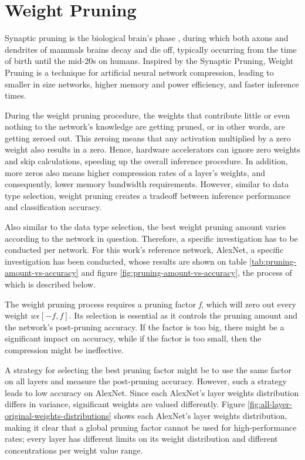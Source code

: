 \section{Weight Pruning}
Synaptic pruning is the biological brain's phase \cite{Synaptic-Pruning-Wikipedia}, during which both axons and dendrites of mammals brains decay and die off, typically occurring from the time of birth until the mid-20s on humans. Inspired by the Synaptic Pruning, Weight Pruning is a technique for artificial neural network compression, leading to smaller in size networks, higher memory and power efficiency, and faster inference times.

During the weight pruning procedure, the weights that contribute little or even nothing to the network's knowledge are getting pruned, or in other words, are getting zeroed out. This zeroing means that any activation multiplied by a zero weight also results in a zero. Hence, hardware accelerators can ignore zero weights and skip calculations, speeding up the overall inference procedure. In addition, more zeros also means higher compression rates of a layer's weights, and consequently, lower memory bandwidth requirements. However, similar to data type selection, weight pruning creates a tradeoff between inference performance and classification accuracy.

Also similar to the data type selection, the best weight pruning amount varies according to the network in question. Therefore, a specific investigation has to be conducted per network. For this work's reference network, AlexNet, a specific investigation has been conducted, whose results are shown on table \ref{tab:pruning-amount-vs-accuracy} and figure \ref{fig:pruning-amount-vs-accuracy}, the process of which is described below.

The weight pruning process requires a pruning factor \emph{f}, which will zero out every weight $w \epsilon [-f, f]$. Its selection is essential as it controls the pruning amount and the network's post-pruning accuracy. If the factor is too big, there might be a significant impact on accuracy, while if the factor is too small, then the compression might be ineffective.

A strategy for selecting the best pruning factor might be to use the same factor on all layers and measure the post-pruning accuracy. However, such a strategy leads to low accuracy on AlexNet. Since each AlexNet's layer weights distribution differs in variance, significant weights are valued differently. Figure \ref{fig:all-layer-original-weights-distributions} shows each AlexNet's layer weights distribution, making it clear that a global pruning factor cannot be used for high-performance rates; every layer has different limits on its weight distribution and different concentrations per weight value range.

